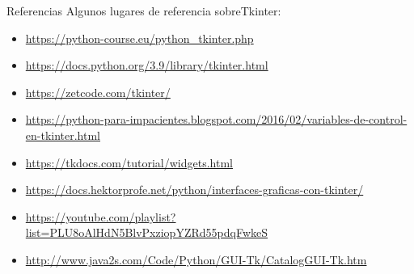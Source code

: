 \documentclass[10pt, envcountsect , spanish]{beamer}
\begin{document}
\begin{frame}{Referencias}
Algunos lugares de referencia  sobreTkinter: 

\begin{itemize} \footnotesize
\item \url{https://python-course.eu/python_tkinter.php}
\item \url{https://docs.python.org/3.9/library/tkinter.html}
\item \url{https://zetcode.com/tkinter/}
\item \url{https://python-para-impacientes.blogspot.com/2016/02/variables-de-control-en-tkinter.html}
\item \url{https://tkdocs.com/tutorial/widgets.html}
\item \url{https://docs.hektorprofe.net/python/interfaces-graficas-con-tkinter/}
\item \url{https://youtube.com/playlist?list=PLU8oAlHdN5BlvPxziopYZRd55pdqFwkeS}
\item \url{http://www.java2s.com/Code/Python/GUI-Tk/CatalogGUI-Tk.htm}
\end{itemize}

\end{frame}
\end{document}
